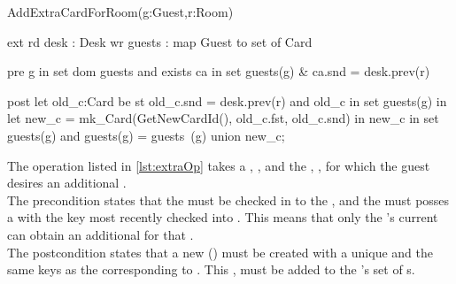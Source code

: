 \documentclass[Main]{subfiles}
\begin{document}
\begin{vdmsl}[label=lst:extraOp,caption= Operation \code{AddExtraCardForRoom()} ]
AddExtraCardForRoom(g:Guest,r:Room)

ext rd desk   : Desk
    wr guests : map Guest to set of Card
    
pre g in set dom guests and  
		exists ca in set guests(g) & ca.snd = desk.prev(r)

post let old_c:Card be st old_c.snd = desk.prev(r) and old_c in set guests(g) in 
		let new_c = mk_Card(GetNewCardId(), old_c.fst, old_c.snd) in 
		new_c in set guests(g) and 
		guests(g) = guests~(g) union {new_c}; 
\end{vdmsl}
The operation listed in \codeTitle \ref{lst:extraOp} takes a , , and the , , for which the guest desires an additional . \\ 
The precondition states that the  must be checked in to the , and the must posses a  with the key most recently checked into . This means that only the 's current  can obtain an additional  for that .
\\
The postcondition states that a new  () must be created with a unique  and the same keys as the  corresponding to . This ,  must be added to the 's set of s. 
\end{document}
